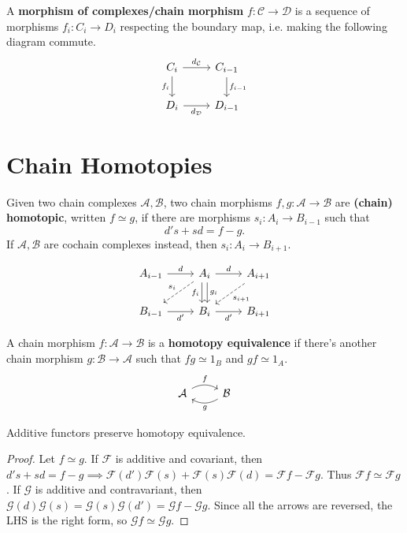 \documentclass[twoside,10pt]{report}
\begin{document}
A \textbf{morphism of complexes/chain morphism} $f:\mathcal{C}\to \mathcal{D}$ is a sequence of morphisms $f_i:C_i\to D_i$ respecting the boundary map, i.e. making the following diagram commute.
\[
	\begin{tikzcd}
		C_i \arrow[d, "f_i"'] \arrow[r, "d_\mathcal{C}"] & C_{i-1} \arrow[d, "f_{i-1}"] \\
		D_i \arrow[r, "d_\mathcal{D}"']                & D_{i-1}
	\end{tikzcd}
\]


\section{Chain Homotopies}

\begin{defn}[]
Given two chain complexes $\mathcal{A},\mathcal{B}$, two chain morphisms $f,g:\mathcal{A}\to \mathcal{B}$ are \textbf{(chain) homotopic}, written $f \simeq g$, if there are morphisms $s_i:A_i\to B_{i-1}$ such that
\[
	d's + sd = f-g.
\]
If $\mathcal{A}, \mathcal{B}$ are cochain complexes instead, then $s_i:A_{i}\to B_{i+1}$.
\end{defn}
\[
\begin{tikzcd}
	A_{i-1} \rar{d} & A_i \rar{d}\dar[shift right, "f_i"']\dar[shift left]{g_i}\arrow[dl,dashed,"s_i"'] & A_{i+1} \arrow[dl,dashed,"s_{i+1}"] \\
	B_{i-1} \rar["d'"'] & B_i \rar["d'"'] & B_{i+1}
\end{tikzcd}
\] 

\begin{defn}[]
	A chain morphism $f:\mathcal{A}\to \mathcal{B}$ is a \textbf{homotopy equivalence} if there's another chain morphism $g:\mathcal{B}\to \mathcal{A}$ such that $fg \simeq 1_{B}$ and $gf \simeq 1_{A}$.
	\[
	\begin{tikzcd}
		\mathcal{A} \rar[bend left]{f} & \mathcal{B} \lar[bend left]{g}
	\end{tikzcd}
	\] 
\end{defn}

\begin{prop}
	\label{functors-preserve-homotopy}
Additive functors preserve homotopy equivalence.
\end{prop}
\begin{proof}
	Let $f\simeq g$. If $\mathcal{F}$ is additive and covariant, then $d's+sd = f-g \implies \mathcal{F}(d')\mathcal{F}(s)+\mathcal{F}(s)\mathcal{F}(d) = \mathcal{F}f - \mathcal{F}g$. Thus $\mathcal{F}f \simeq \mathcal{F}g$. If $\mathcal{G}$ is additive and contravariant, then $\mathcal{G}(d)\mathcal{G}(s) = \mathcal{G}(s)\mathcal{G}(d') = \mathcal{G}f-\mathcal{G}g$. Since all the arrows are reversed, the LHS is the right form, so $\mathcal{G}f \simeq \mathcal{G}g$.
\end{proof}
\end{document}
